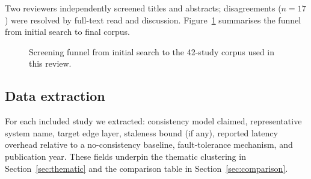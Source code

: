 Two reviewers independently screened titles and abstracts; disagreements ($n=17$) were resolved by
full-text read and discussion. Figure~\ref{fig:prisma} summarises the funnel from initial search to
final corpus.

\begin{figure}[h!]
\centering
{}
\caption{Screening funnel from initial search to the 42-study corpus used in this review.}
\label{fig:prisma}
\end{figure}

\subsection{Data extraction}

For each included study we extracted: consistency model claimed, representative system name, target
edge layer, staleness bound (if any), reported latency overhead relative to a no-consistency baseline,
fault-tolerance mechanism, and publication year. These fields underpin the thematic clustering in
Section~\ref{sec:thematic} and the comparison table in Section~\ref{sec:comparison}.
